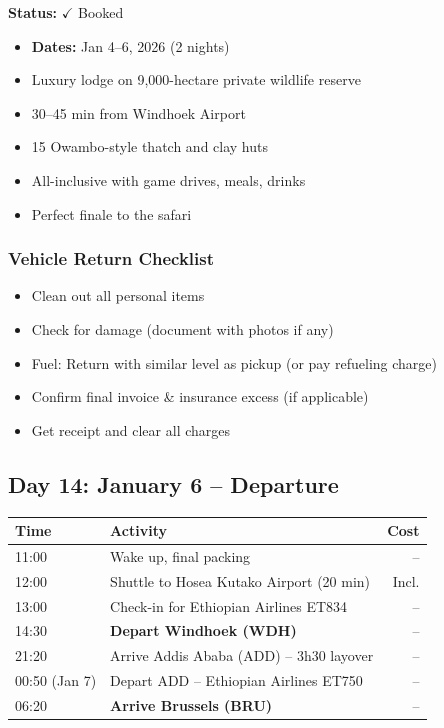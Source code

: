\documentclass[11pt]{article}
\newcommand{\booked}{\textcolor{accentcolor}{$\checkmark$ Booked}}
\begin{document}
\textbf{Status:} \booked

\begin{itemize}
    \item \textbf{Dates:} Jan 4--6, 2026 (2 nights)
    \item Luxury lodge on 9,000-hectare private wildlife reserve
    \item 30--45 min from Windhoek Airport
    \item 15 Owambo-style thatch and clay huts
    \item All-inclusive with game drives, meals, drinks
    \item Perfect finale to the safari
\end{itemize}

\subsubsection{Vehicle Return Checklist}

\begin{itemize}
    \item Clean out all personal items
    \item Check for damage (document with photos if any)
    \item Fuel: Return with similar level as pickup (or pay refueling charge)
    \item Confirm final invoice \& insurance excess (if applicable)
    \item Get receipt and clear all charges
\end{itemize}

\clearpage
\subsection{Day 14: January 6 -- Departure}

\begin{tabular}{llr}
\toprule
\textbf{Time} & \textbf{Activity} & \textbf{Cost} \\
\midrule
11:00 & Wake up, final packing & -- \\
12:00 & Shuttle to Hosea Kutako Airport (20 min) & Incl. \\
13:00 & Check-in for Ethiopian Airlines ET834 & -- \\
14:30 & \textbf{Depart Windhoek (WDH)} & -- \\
21:20 & Arrive Addis Ababa (ADD) -- 3h30 layover & -- \\
00:50 (Jan 7) & Depart ADD -- Ethiopian Airlines ET750 & -- \\
06:20 & \textbf{Arrive Brussels (BRU)} & -- \\
\bottomrule
\end{tabular}
\end{document}
